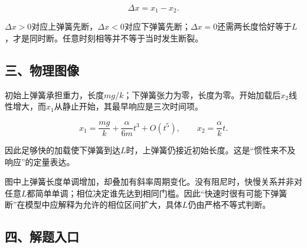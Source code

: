 \documentclass[12pt,a4paper,fontset=fandol]{ctexart}
\begin{document}
\[
\Delta x=x_1-x_2.
\]

\(\Delta x>0\)对应上弹簧先断，\(\Delta x<0\)对应下弹簧先断；\(\Delta x=0\)还需两长度恰好等于\(L\)，才是同时断。任意时刻相等并不等于当时发生断裂。

\subsection{三、物理图像}\label{ux4e09ux7269ux7406ux56feux50cf-4}

初始上弹簧承担重力，长度\(mg/k\)；下弹簧张力为零，长度为零。开始加载后\(x_2\)线性增大，而\(x_1\)从静止开始，其最早响应是三次时间项。

\[
x_1=\frac{mg}k+\frac{\alpha}{6m}t^3+O(t^5),
\qquad x_2=\frac{\alpha}k t.
\]

因此足够快的加载使下弹簧到达\(L\)时，上弹簧仍接近初始长度。这是``惯性来不及响应''的定量表达。

\begin{center}
\begin{minipage}{\linewidth}
\centering\begingroup{}
\ifdim\wd\diagrambox>.88\linewidth
\sbox{\diagrambox}{\resizebox{.88\linewidth}{!}{\usebox{\diagrambox}}}\fi
\ifdim\ht\diagrambox>.38\textheight
\resizebox{!}{.38\textheight}{\usebox{\diagrambox}}
\else\usebox{\diagrambox}\fi
\par{}\endgroup\end{minipage}\end{center}

图中上弹簧长度单调增加，却叠加有斜率周期变化。没有阻尼时，快慢关系并非对任意\(L\)都简单单调；相位决定谁先达到相同门槛。因此``快速时很有可能下弹簧断''在模型中应解释为允许的相位区间扩大，具体\(L\)仍由严格不等式判断。

\subsection{四、解题入口}\label{ux56dbux89e3ux9898ux5165ux53e3-4}
\end{document}
